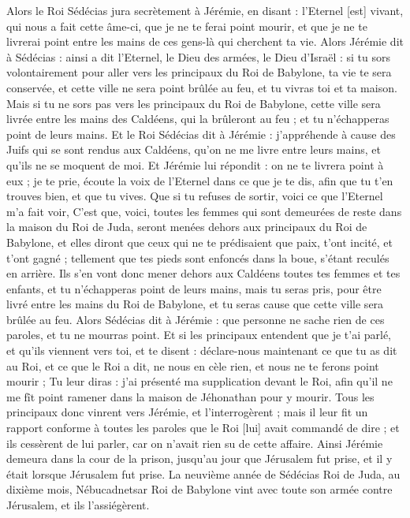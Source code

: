 \begin{multicols}{2}
Alors le Roi Sédécias jura secrètement à Jérémie, en disant : l'Eternel [est] vivant, qui nous a fait cette âme-ci, que je ne te ferai point mourir, et que je ne te livrerai point entre les mains de ces gens-là qui cherchent ta vie.
Alors Jérémie dit à Sédécias : ainsi a dit l'Eternel, le Dieu des armées, le Dieu d'Israël : si tu sors volontairement pour aller vers les principaux du Roi de Babylone, ta vie te sera conservée, et cette ville ne sera point brûlée au feu, et tu vivras toi et ta maison.
Mais si tu ne sors pas vers les principaux du Roi de Babylone, cette ville sera livrée entre les mains des Caldéens, qui la brûleront au feu ; et tu n'échapperas point de leurs mains.
Et le Roi Sédécias dit à Jérémie : j'appréhende à cause des Juifs qui se sont rendus aux Caldéens, qu'on ne me livre entre leurs mains, et qu'ils ne se moquent de moi.
Et Jérémie lui répondit : on ne te livrera point à eux ; je te prie, écoute la voix de l'Eternel dans ce que je te dis, afin que tu t'en trouves bien, et que tu vives.
Que si tu refuses de sortir, voici ce que l'Eternel m'a fait voir,
C'est que, voici, toutes les femmes qui sont demeurées de reste dans la maison du Roi de Juda, seront menées dehors aux principaux du Roi de Babylone, et elles diront que ceux qui ne te prédisaient que paix, t'ont incité, et t'ont gagné ; tellement que tes pieds sont enfoncés dans la boue, s'étant reculés en arrière.
Ils s'en vont donc mener dehors aux Caldéens toutes tes femmes et tes enfants, et tu n'échapperas point de leurs mains, mais tu seras pris, pour être livré entre les mains du Roi de Babylone, et tu seras cause que cette ville sera brûlée au feu.
Alors Sédécias dit à Jérémie : que personne ne sache rien de ces paroles, et tu ne mourras point.
Et si les principaux entendent que je t'ai parlé, et qu'ils viennent vers toi, et te disent : déclare-nous maintenant ce que tu as dit au Roi, et ce que le Roi a dit, ne nous en cèle rien, et nous ne te ferons point mourir ;
Tu leur diras : j'ai présenté ma supplication devant le Roi, afin qu'il ne me fît point ramener dans la maison de Jéhonathan pour y mourir.
Tous les principaux donc vinrent vers Jérémie, et l'interrogèrent ; mais il leur fit un rapport conforme à toutes les paroles que le Roi [lui] avait commandé de dire ; et ils cessèrent de lui parler, car on n'avait rien su de cette affaire.
Ainsi Jérémie demeura dans la cour de la prison, jusqu’au jour que Jérusalem fut prise, et il y était lorsque Jérusalem fut prise.
\VerseOne{}La neuvième année de Sédécias Roi de Juda, au dixième mois, Nébucadnetsar Roi de Babylone vint avec toute son armée contre Jérusalem, et ils l'assiégèrent.

\end{multicols}
